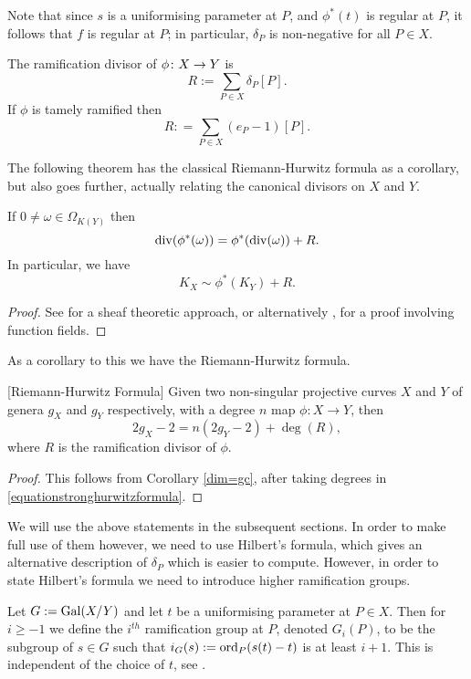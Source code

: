 Note that since $s$ is a uniformising parameter at $P$, and $\phi^*(t)$ is regular at $P$, it follows that $f$ is regular at $P$; in particular, $\delta_P$ is non-negative for all $P \in X$.
 
    \begin{defn}\label{defnramificationdivisor}
    The ramification divisor of $\phi \colon X \rightarrow Y$ is 
        \[
        R:= \sum_{P \in X} \delta_P [P].
        \]
    If $\phi$ is tamely ramified then 
        \[
        R: = \sum_{P \in X} (e_P - 1)[P].
        \]
    \end{defn}

The following theorem has the classical Riemann-Hurwitz formula as a corollary, but also goes further, actually relating the canonical divisors on $X$ and $Y$.
    \begin{thm}\label{theoremdetailedhurwitz}
    If $0 \neq \omega \in \Omega_{K(Y)}$ then
        \begin{equation}\label{equationstronghurwitzformula}
        \operatorname{div}(\phi^*(\omega)) = \phi^*(\operatorname{div}(\omega)) + R.
        \end{equation}
    In particular, we have
        \[
        K_X \sim \phi^*(K_Y) + R.
        \]
    \end{thm}
    \begin{proof}
    See \cite[Chap.\ IV, \S 2, Prop.\ 2.3]{hart} for a sheaf theoretic approach, or alternatively \cite[Thm. 3.4.6]{stichtenoth}, for a proof involving function fields.
    \end{proof}


As a corollary to this we have the Riemann-Hurwitz formula.
    \begin{cor}\label{corhurwitzformula}[Riemann-Hurwitz Formula]
    Given two non-singular projective curves $X$ and $Y$ of genera $g_X$ and $g_Y$ respectively, with a degree $n$ map $\phi\colon X \rightarrow Y$, then
        \[
        2g_X - 2 = n(2g_Y -2) + \deg(R),
        \]
    where $R$ is the ramification divisor of $\phi$.
    \end{cor}
    \begin{proof}
    This follows from Corollary \ref{dim=gc}, after taking degrees in \eqref{equationstronghurwitzformula}.
    \end{proof}


We will use the above statements in the subsequent sections.
In order to make full use of them however, we need to use Hilbert's formula, which gives an alternative description of $\delta_P$ which is easier to compute.
However, in order to state Hilbert's formula we need to introduce higher ramification groups.
   \begin{defn}
    Let $G:=\operatorname{Gal}(X/Y)$ and let $t$ be a uniformising parameter at $P\in X$.
    Then for $i\geq -1$ we define the $i^{th}$ ramification group at $P$, denoted $G_i(P)$, to be the subgroup of $s\in G$ such that $i_G(s) := \operatorname{ord}_P(s(t)-t)$ is at least $i+1$.
    This is	independent of the choice of $t$, see \cite[Chap. IV, \S 1, pg. 62]{localfields}.
    \end{defn}

